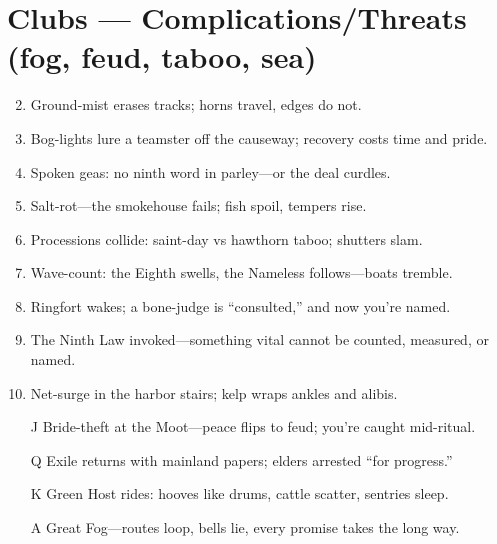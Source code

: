 \section*{Clubs --- Complications/Threats (fog, feud, taboo, sea)}
\label{sec:theona-complications}
\begin{enumerate}
\setcounter{enumi}{1}
\item Ground-mist erases tracks; horns travel, edges do not.
\item Bog-lights lure a teamster off the causeway; recovery costs time and pride.
\item Spoken geas: no ninth word in parley---or the deal curdles.
\item Salt-rot---the smokehouse fails; fish spoil, tempers rise.
\item Processions collide: saint-day vs hawthorn taboo; shutters slam.
\item Wave-count: the Eighth swells, the Nameless follows---boats tremble.
\item Ringfort wakes; a bone-judge is ``consulted,'' and now you're named.
\item The Ninth Law invoked---something vital cannot be counted, measured, or named.
\item Net-surge in the harbor stairs; kelp wraps ankles and alibis.
\item[J] Bride-theft at the Moot---peace flips to feud; you're caught mid-ritual.
\item[Q] Exile returns with mainland papers; elders arrested ``for progress.''
\item[K] Green Host rides: hooves like drums, cattle scatter, sentries sleep.
\item[A] Great Fog---routes loop, bells lie, every promise takes the long way.
\end{enumerate}


